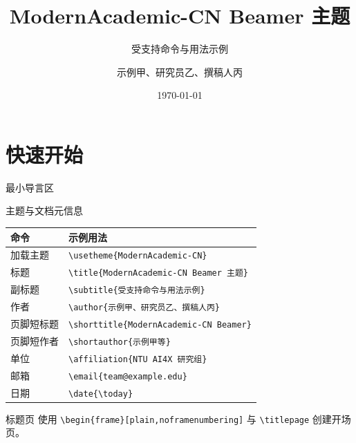 \documentclass[aspectratio=169,10pt]{ctexbeamer}
\title{ModernAcademic-CN Beamer 主题}
\subtitle{受支持命令与用法示例}
\author{示例甲、研究员乙、撰稿人丙}
\affiliation{NTU AI4X 研究组}
\date{\today}
\begin{document}
\begin{frame}
  \titlepage
\end{frame}

\section{快速开始}

\begin{academicframe}[加载主题并填写元信息]{最小导言区}
  \begin{block}{主题与文档元信息}
    \scriptsize
    \begin{tabular}{ll}
      \toprule
      命令 & 示例用法 \\
      \midrule
      加载主题 & \texttt{\textbackslash usetheme\{ModernAcademic-CN\}} \\
      标题 & \texttt{\textbackslash title\{ModernAcademic-CN Beamer 主题\}} \\
      副标题 & \texttt{\textbackslash subtitle\{受支持命令与用法示例\}} \\
      作者 & \texttt{\textbackslash author\{示例甲、研究员乙、撰稿人丙\}} \\
      页脚短标题 & \texttt{\textbackslash shorttitle\{ModernAcademic-CN Beamer\}} \\
      页脚短作者 & \texttt{\textbackslash shortauthor\{示例甲等\}} \\
      单位 & \texttt{\textbackslash affiliation\{NTU AI4X 研究组\}} \\
      邮箱 & \texttt{\textbackslash email\{team@example.edu\}} \\
      日期 & \texttt{\textbackslash date\{\textbackslash today\}} \\
      \bottomrule
    \end{tabular}
  \end{block}

  \vspace{0.45em}
  \begin{exampleblock}{标题页}
    \scriptsize
    使用 \texttt{\textbackslash begin\{frame\}[plain,noframenumbering]}
    与 \texttt{\textbackslash titlepage} 创建开场页。
  \end{exampleblock}
\end{academicframe}
\end{document}
